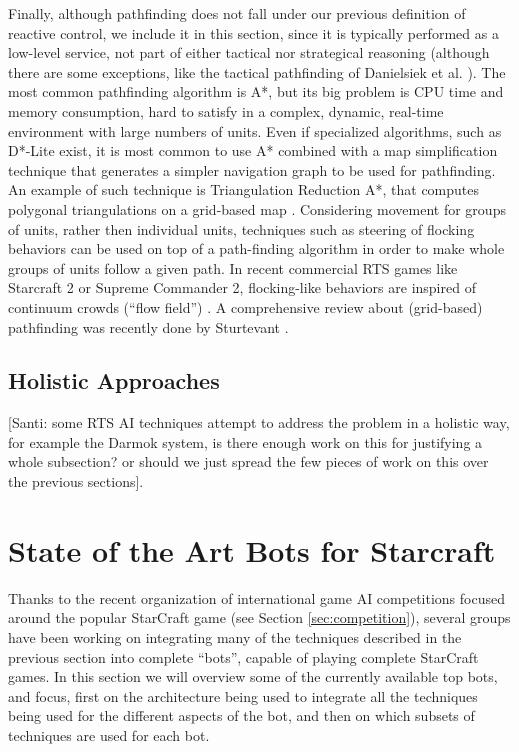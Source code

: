 \documentclass[journal]{IEEEtran}
\begin{document}
Finally, although pathfinding does not fall under our previous definition of reactive control, we include it in this section, since it is typically performed as a low-level service, not part of either tactical nor strategical reasoning (although there are some exceptions, like the tactical pathfinding of Danielsiek et al. \cite{Danielsiek_2008}). The most common pathfinding algorithm is A*, but its big problem is CPU time and memory consumption, hard to satisfy in a complex, dynamic, real-time environment with large numbers of units. Even if specialized algorithms, such as D*-Lite \cite{KoenigL02} exist, it is most common to use A* combined with a map simplification technique that generates a simpler navigation graph to be used for pathfinding. An example of such technique is Triangulation Reduction A*, that computes polygonal triangulations on a grid-based map \cite{Demyen_2006}. Considering movement for groups of units, rather then individual units, techniques such as steering of flocking behaviors \cite{Reynolds_1999} can be used on top of a path-finding algorithm in order to make whole groups of units follow a given path. In recent commercial RTS games like Starcraft 2 or Supreme Commander 2, flocking-like behaviors are inspired of continuum crowds (``flow field'') \cite{Treuille2006}. A comprehensive review about (grid-based) pathfinding was recently done by Sturtevant \cite{sturtevant2012benchmarks}.

\subsection{Holistic Approaches}

{\color{red} [Santi: some RTS AI techniques attempt to address the problem in a holistic way, for example the Darmok system, is there enough work on this for justifying a whole subsection? or should we just spread the few pieces of work on this over the previous sections].}

\section{State of the Art Bots for Starcraft}\label{sec:bot}

Thanks to the recent organization of international game AI competitions focused around the popular StarCraft game (see Section \ref{sec:competition}), several groups have been working on integrating many of the techniques described in the previous section into complete ``bots'', capable of playing complete StarCraft games. In this section we will overview some of the currently available top bots, and focus, first on the architecture being used to integrate all the techniques being used for the different aspects of the bot, and then on which subsets of techniques are used for each bot.
\end{document}
